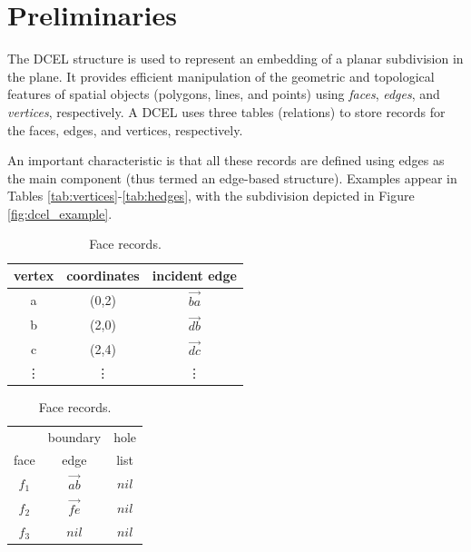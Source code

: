 \section{Preliminaries} \label{sec:prelim}

The DCEL \cite{muller_finding_1978} structure is used to represent an embedding of a planar subdivision in the plane. It provides efficient manipulation of the geometric and topological features of spatial objects (polygons, lines, and points) using \textit{faces}, \textit{edges}, and \textit{vertices}, respectively. A DCEL uses three tables (relations) to store records for the faces, edges, and vertices, respectively. 

An important characteristic is that all these records are defined using edges as the main component (thus termed an edge-based structure). Examples appear in Tables \ref{tab:vertices}-\ref{tab:hedges}, with the subdivision depicted in Figure \ref{fig:dcel_example}.

\begin{table} \label{tab:records}
\begin{minipage}{0.49\textwidth}
    \small
    \centering
    \caption{Vertex records.}\label{tab:vertices}
    \begin{tabular}{c c c}
        \toprule
        vertex & coordinates & incident edge \\
        \midrule
        a      & (0,2)  & $\vec{ba}$ \\
        b      & (2,0)  & $\vec{db}$ \\
        c      & (2,4)  & $\vec{dc}$ \\
        \vdots & \vdots & \vdots     \\
        \bottomrule
    \end{tabular}
\end{minipage}\hfill %
\begin{minipage}{0.49\textwidth}
    \small
    \centering
    \caption{Face records.}\label{tab:faces}
    \begin{tabular}{c c c} 
        \toprule
             & boundary  & hole\\
        face & edge      & list\\
        \midrule
        $f_1$ & $\vec{ab}$ & $nil$ \\
        $f_2$ & $\vec{fe}$ & $nil$ \\
        $f_3$ & $nil$      & $nil$ \\
        \bottomrule
    \end{tabular}
\end{minipage}
\end{table}

